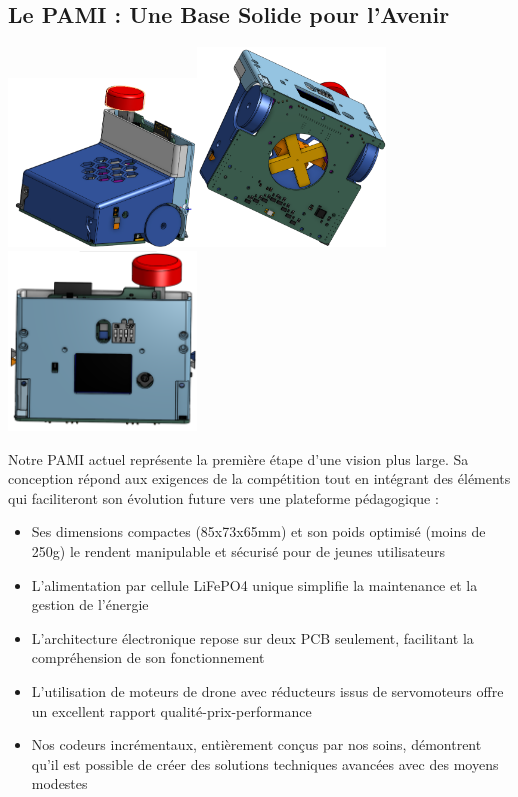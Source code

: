 \documentclass{article}
\begin{document}
\subsection{Le PAMI : Une Base Solide pour l'Avenir}

\includegraphics[width = 5cm]{pami_1}\includegraphics[width = 5cm]{pami_3}\includegraphics[width = 5cm]{pami_2}

Notre PAMI actuel représente la première étape d'une vision plus large. Sa conception répond aux exigences de la compétition tout en intégrant des éléments qui faciliteront son évolution future vers une plateforme pédagogique :


\begin{itemize}
    \item Ses dimensions compactes (85x73x65mm) et son poids optimisé (moins de 250g) le rendent manipulable et sécurisé pour de jeunes utilisateurs
    \item L'alimentation par cellule LiFePO4 unique simplifie la maintenance et la gestion de l'énergie
    \item L'architecture électronique repose sur deux PCB seulement, facilitant la compréhension de son fonctionnement
    \item L'utilisation de moteurs de drone avec réducteurs issus de servomoteurs offre un excellent rapport qualité-prix-performance
    \item Nos codeurs incrémentaux, entièrement conçus par nos soins, démontrent qu'il est possible de créer des solutions techniques avancées avec des moyens modestes
\end{itemize}
\end{document}
